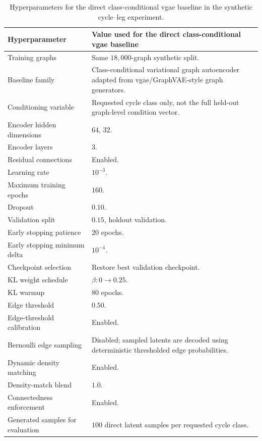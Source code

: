 \begin{table}[p]
\centering
\footnotesize
\begin{tabularx}{\textwidth}{@{}p{}X@{}}
\toprule
Hyperparameter & Value used for the direct class-conditional \gls{vgae} baseline \\
\midrule
Training graphs & Same \(18{,}000\)-graph synthetic split. \\
Baseline family & Class-conditional variational graph autoencoder adapted from \gls{vgae}/GraphVAE-style graph generators. \\
Conditioning variable & Requested cycle class only, not the full held-out graph-level condition vector. \\
Encoder hidden dimensions & \(64\), \(32\). \\
Encoder layers & \(3\). \\
Residual connections & Enabled. \\
Learning rate & \(10^{-3}\). \\
Maximum training epochs & \(160\). \\
Dropout & \(0.10\). \\
Validation split & \(0.15\), holdout validation. \\
Early stopping patience & \(20\) epochs. \\
Early stopping minimum delta & \(10^{-4}\). \\
Checkpoint selection & Restore best validation checkpoint. \\
KL weight schedule & \(\beta:0\rightarrow0.25\). \\
KL warmup & \(80\) epochs. \\
Edge threshold & \(0.50\). \\
Edge-threshold calibration & Enabled. \\
Bernoulli edge sampling & Disabled; sampled latents are decoded using deterministic thresholded edge probabilities. \\
Dynamic density matching & Enabled. \\
Density-match blend & \(1.0\). \\
Connectedness enforcement & Enabled. \\
Generated samples for evaluation & \(100\) direct latent samples per requested cycle class. \\
\bottomrule
\end{tabularx}
\caption{Hyperparameters for the direct class-conditional \gls{vgae} baseline in the synthetic cycle--leg experiment.}
\label{tab:synthetic-cycle-leg-vgae-hyperparameters}
\end{table}

